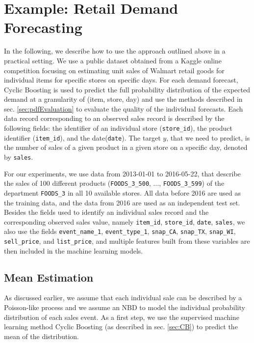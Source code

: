 \documentclass[BCOR=1mm, DIV=calc,10pt,
twoside=true,
twocolumn,
headings=normal]{scrartcl}
\begin{document}
\section{Example: Retail Demand Forecasting}
\label{sec:example}

In the following, we describe how to use the approach outlined above in a practical setting. We use a public dataset obtained from a Kaggle online competition focusing on estimating unit sales of Walmart retail goods \cite{kaggle_data} for individual items for specific stores on specific days. For each demand forecast, Cyclic Boosting is used to predict the full probability distribution of the expected demand at a granularity of (item, store, day) and use the methods described in sec. \ref{sec:pdfEvaluation} to evaluate the quality of the individual forecasts. Each data record corresponding to an observed sales record is described by the following fields: the identifier of an individual store (\texttt{store\_id}), the product identifier (\texttt{item\_id}), and the date(\texttt{date}). The target $y$, that we need to predict, is the number of sales of a given product in a given store on a specific day, denoted by \texttt{sales}.

For our experiments, we use data from 2013-01-01 to 2016-05-22, that describe the sales of 100 different products (\texttt{FOODS\_3\_500}, ..., \texttt{FOODS\_3\_599}) of the department \texttt{FOODS\_3} in all 10 available stores.  All data before 2016 are used as the training data, and the data from 2016 are used as an independent test set. Besides the fields used to identify an individual sales record and the corresponding observed sales value, namely \texttt{item\_id}, \texttt{store\_id}, \texttt{date}, \texttt{sales}, we also use the fields \texttt{event\_name\_1}, \texttt{event\_type\_1}, \texttt{snap\_CA}, \texttt{snap\_TX}, \texttt{snap\_WI}, \texttt{sell\_price}, and \texttt{list\_price}, and multiple features built from these variables are then included in the machine learning models.

\subsection{Mean Estimation}
\label{sec:example_mean}

As discussed earlier, we assume that each individual sale can be described by a Poisson-like process and we assume an NBD to model the individual probability distribution of each sales event. As a first step, we use the supervised machine learning method Cyclic Boosting (as described in sec. \ref{sec:CB}) to predict the mean of the distribution.
\end{document}
